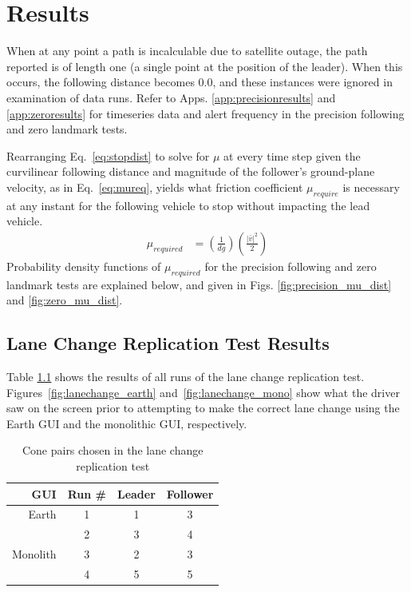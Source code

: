 \chapter{Results} \label{chap:results}

When at any point a path is incalculable due to satellite outage, the path reported is of length one (a single point at the position of the leader). When this occurs, the following distance becomes 0.0, and these instances were ignored in examination of data runs. Refer to Apps. \ref{app:precisionresults} and \ref{app:zeroresults} for timeseries data and alert frequency in the precision following and zero landmark tests.

Rearranging Eq.~\eqref{eq:stopdist} to solve for $\mu$ at every time step given the curvilinear following distance and magnitude of the follower's ground-plane velocity, as in Eq.~\eqref{eq:mureq}, yields what friction coefficient $\mu_{require}$ is necessary at any instant for the following vehicle to stop without impacting the lead vehicle.
\begin{align} \label{eq:mureq}
    \mu_{required} &= \left( \frac {1} {d g} \right) \left(\frac {|\bar{v}|^2} {2} \right)
\end{align}
Probability density functions of $\mu_{required}$ for the precision following and zero landmark tests are explained below, and given in Figs. \ref{fig:precision_mu_dist} and \ref{fig:zero_mu_dist}.


\section{Lane Change Replication Test Results} \label{sec:lanechangetestresults}

Table \ref{tab:lanechangeresults} shows the results of all runs of the lane change replication test. Figures~\ref{fig:lanechange_earth} and~\ref{fig:lanechange_mono} show what the driver saw on the screen prior to attempting to make the correct lane change using the Earth GUI and the monolithic GUI, respectively.

\begin{table}[htbp] \centering \caption{Cone pairs chosen in the lane change replication test}
\begin{tabular}{rc|cc} 
    GUI&    Run \#  &     Leader&    Follower \\ \hline\hline
    Earth&      1       &       1   &    3 \\
         &      2       &       3   &    4   \\ \hline
    Monolith&   3       &       2   &    3   \\
         &      4       &       5   &    5 \\ \hline   
\end{tabular} \label{tab:lanechangeresults} \end{table}

